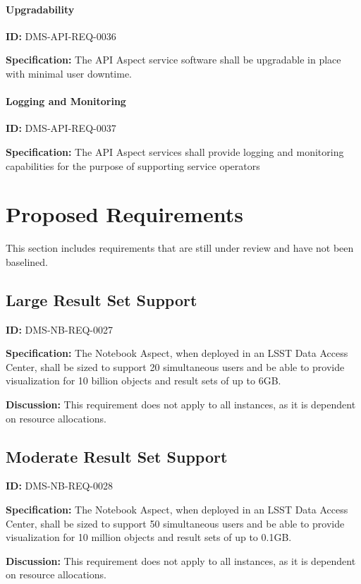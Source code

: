 \documentclass[SE,toc,lsstdraft]{lsstdoc}
\newcommand{\addendum}{}
\begin{document}
\paragraph{Upgradability}\hfill  %

\label{DMS-API-REQ-0036}
\textbf{ID:} DMS-API-REQ-0036

\textbf{Specification:}
The API Aspect service software shall be upgradable in place with minimal user downtime.

\paragraph{Logging and Monitoring}\hfill  %

\label{DMS-API-REQ-0037}
\textbf{ID:} DMS-API-REQ-0037

\textbf{Specification:}
The API Aspect services shall provide logging and monitoring capabilities for the purpose of supporting service operators

\section{Proposed Requirements}

This section includes requirements that are still under review and have not been baselined.

\subsection{Large Result Set Support}

\label{DMS-NB-REQ-0027}
\textbf{ID:} DMS-NB-REQ-0027

\textbf{Specification:}
The Notebook Aspect, when deployed in an LSST Data Access Center, shall be sized to support 20 simultaneous users and be able to provide visualization for 10 billion objects and result sets of up to 6GB.

\textbf{Discussion:}
This requirement does not apply to all instances, as it is dependent on resource allocations.

\subsection{Moderate Result Set Support}

\label{DMS-NB-REQ-0028}
\textbf{ID:} DMS-NB-REQ-0028

\textbf{Specification:}
The Notebook Aspect, when deployed in an LSST Data Access Center, shall be sized to support 50 simultaneous users and be able to provide visualization for 10 million objects and result sets of up to 0.1GB.

\textbf{Discussion:}
This requirement does not apply to all instances, as it is dependent on resource allocations.

\addendum


\end{document}
